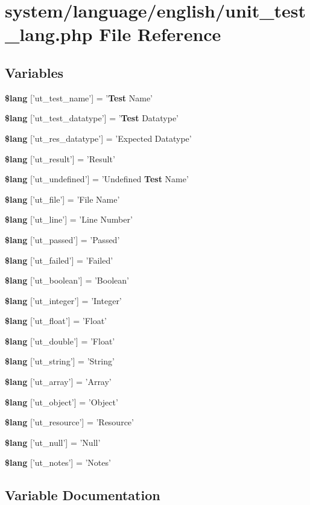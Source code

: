 \section{system/language/english/unit\-\_\-test\-\_\-lang.php File Reference}
\label{unit__test__lang_8php}
\subsection*{Variables}
\begin{DoxyCompactItemize}
\item 
{\bf \$lang} ['ut\-\_\-test\-\_\-name'] = '{\bf Test} Name'
\item 
{\bf \$lang} ['ut\-\_\-test\-\_\-datatype'] = '{\bf Test} Datatype'
\item 
{\bf \$lang} ['ut\-\_\-res\-\_\-datatype'] = 'Expected Datatype'
\item 
{\bf \$lang} ['ut\-\_\-result'] = 'Result'
\item 
{\bf \$lang} ['ut\-\_\-undefined'] = 'Undefined {\bf Test} Name'
\item 
{\bf \$lang} ['ut\-\_\-file'] = 'File Name'
\item 
{\bf \$lang} ['ut\-\_\-line'] = 'Line Number'
\item 
{\bf \$lang} ['ut\-\_\-passed'] = 'Passed'
\item 
{\bf \$lang} ['ut\-\_\-failed'] = 'Failed'
\item 
{\bf \$lang} ['ut\-\_\-boolean'] = 'Boolean'
\item 
{\bf \$lang} ['ut\-\_\-integer'] = 'Integer'
\item 
{\bf \$lang} ['ut\-\_\-float'] = 'Float'
\item 
{\bf \$lang} ['ut\-\_\-double'] = 'Float'
\item 
{\bf \$lang} ['ut\-\_\-string'] = 'String'
\item 
{\bf \$lang} ['ut\-\_\-array'] = 'Array'
\item 
{\bf \$lang} ['ut\-\_\-object'] = 'Object'
\item 
{\bf \$lang} ['ut\-\_\-resource'] = 'Resource'
\item 
{\bf \$lang} ['ut\-\_\-null'] = 'Null'
\item 
{\bf \$lang} ['ut\-\_\-notes'] = 'Notes'
\end{DoxyCompactItemize}


\subsection{Variable Documentation}
